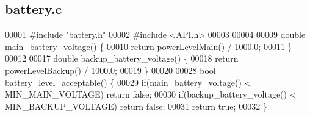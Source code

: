 \subsection{battery.\+c}
\label{battery_8c_source}

\begin{DoxyCode}
00001 \textcolor{preprocessor}{#include "battery.h"}
00002 \textcolor{preprocessor}{#include <API.h>}
00003 
00004 
00009 \textcolor{keywordtype}{double} main_battery_voltage() \{
00010   \textcolor{keywordflow}{return} powerLevelMain() / 1000.0;
00011 \}
00012 
00017 \textcolor{keywordtype}{double} backup_battery_voltage() \{
00018   \textcolor{keywordflow}{return} powerLevelBackup() / 1000.0;
00019 \}
00020 
00028 \textcolor{keywordtype}{bool} battery_level_acceptable() \{
00029   \textcolor{keywordflow}{if}(main_battery_voltage() < MIN_MAIN_VOLTAGE) \textcolor{keywordflow}{return} \textcolor{keyword}{false};
00030   \textcolor{keywordflow}{if}(backup_battery_voltage() < MIN_BACKUP_VOLTAGE) \textcolor{keywordflow}{return} \textcolor{keyword}{false};
00031   \textcolor{keywordflow}{return} \textcolor{keyword}{true};
00032 \}
\end{DoxyCode}
